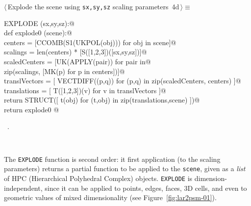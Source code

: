\documentclass[11pt,oneside]{article}	%
\begin{document}
\begin{flushleft} \small
\begin{minipage}{\linewidth} \label{scrap11}
\protect{}$\langle\,$Explode the scene using \texttt{sx,sy,sz} scaling parameters\nobreak\ {\footnotesize 4d}$\,\rangle\equiv$
\vspace{-1ex}
\begin{list}{}{} \item
\mbox{}\verb@def EXPLODE (sx,sy,sz):@\\
\mbox{}\verb@    def explode0 (scene):@\\
\mbox{}\verb@        centers = [CCOMB(S1(UKPOL(obj))) for obj in scene]@\\
\mbox{}\verb@        scalings = len(centers) * [S([1,2,3])([sx,sy,sz])]@\\
\mbox{}\verb@        scaledCenters = [UK(APPLY(pair)) for pair in@\\
\mbox{}\verb@                         zip(scalings, [MK(p) for p in centers])]@\\
\mbox{}\verb@        translVectors = [ VECTDIFF((p,q)) for (p,q) in zip(scaledCenters, centers) ]@\\
\mbox{}\verb@        translations = [ T([1,2,3])(v) for v in translVectors ]@\\
\mbox{}\verb@        return STRUCT([ t(obj) for (t,obj) in zip(translations,scene) ])@\\
\mbox{}\verb@    return explode0  @\\
\mbox{}\verb@@{\NWsep}
\end{list}
\vspace{-1ex}
\footnotesize\addtolength{\baselineskip}{-1ex}
\begin{list}{}{\setlength{\itemsep}{-\parsep}\setlength{\itemindent}{-\leftmargin}}
\item \NWtxtMacroRefIn\ .
\end{list}
\end{minipage}\\[4ex]
\end{flushleft}

The \texttt{EXPLODE} function is second order: it first application (to the scaling parameters) returns a partial function to be applied to the \texttt{scene}, given as a \emph{list} of HPC (Hierarchical Polyhedral Complex) objects. 
\texttt{EXPLODE} is dimension-independent, since it can be applied to points, edges, faces, 3D cells, and even to geometric values of mixed dimensionality (see Figure~\ref{fig:lar2psm-01}).
\end{document}
